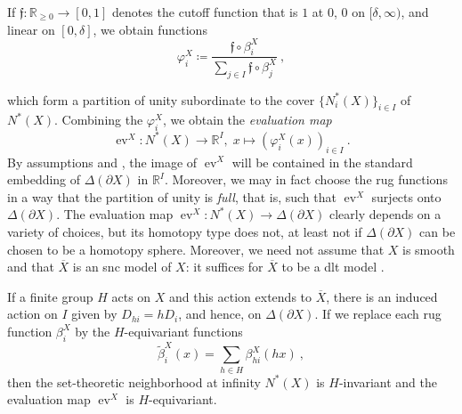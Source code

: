 \documentclass[11pt, a4paper]{amsart}
\theoremstyle{definition}
\theoremstyle{myitemstyle}
\newcommand{\R}{\mathbb{R}}
\DeclareMathOperator{\ev}{ev}
\begin{document}
If $\mathfrak f\colon \R_{\geq 0}\to [0,1]$ denotes the cutoff function that is $1$ at $0$, $0$ on $[\delta,\infty)$, and linear on $[0,\delta]$, we obtain functions 
\begin{equation}
\label{eq:partition of unity}
    \varphi^X_i\coloneqq \frac{\mathfrak f\circ \beta^X_i}{\sum_{j\in I} \mathfrak f\circ \beta^X_j}\ ,
\end{equation}
    
which form a partition of unity subordinate to the cover $\{N^*_i(X)\}_{i\in I}$ of $N^*(X)$. Combining the $\varphi^X_i$, we obtain the \emph{evaluation map}
\[
    \ev^X\colon N^*(X)\to \R^I,\; x\mapsto (\varphi^X_i(x))_{i\in I}\ .
\]
By assumptions  and , the image of $\ev^X$ will be contained in the standard embedding of $\Delta(\partial X)$ in $\R^I$. Moreover, we may in fact choose the rug functions in a way that the partition of unity is \emph{full}, that is, such that $\ev^X$ surjects onto $\Delta(\partial X)$. The evaluation map $\ev^X\colon N^*(X)\to \Delta(\partial X)$ clearly depends on a variety of choices, but its homotopy type does not, at least not if $\Delta(\partial X)$ can be chosen to be a homotopy sphere. Moreover, we need not assume that $X$ is smooth and that $\overline X$ is an snc model of $X$: it suffices for $\overline X$ to be a dlt model \cite{dFKX17}.

If a finite group $H$ acts on $X$ and this action extends to $\overline X$, there is an induced action on $I$ given by $D_{hi}=hD_i$,  and hence, on $\Delta(\partial X)$. If we replace each rug function $\beta^X_i$ by the $H$-equivariant functions
\begin{equation*}
\label{eq:sum of shifts}
    \widetilde \beta^X_i(x)= \sum_{h\in H} \beta^X_{hi}(hx)\ , 
\end{equation*}
then the set-theoretic neighborhood at infinity $N^*(X)$ is $H$-invariant and the evaluation map $\ev^X$ is $H$-equivariant.
\end{document}
